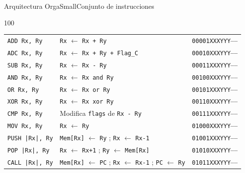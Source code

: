 \documentclass[aspectratio=169]{beamer}
\begin{document}
\begin{frame}[fragile,t]{Arquitectura OrgaSmall}{Conjunto de instrucciones}
\begin{textblock}{100}
\begin{tabular}{l|l|l}
    \texttt{ADD  Rx, Ry}   & \texttt{Rx} $\leftarrow$ \texttt{Rx + Ry}                          & \texttt{\textcolor{r}{00001}\textcolor{v}{XXX}\textcolor{verde}{YYY}\textcolor{gray}{-----}} \\  %
    \texttt{ADC  Rx, Ry}   & \texttt{Rx} $\leftarrow$ \texttt{Rx + Ry + Flag\_C}                & \texttt{\textcolor{r}{00010}\textcolor{v}{XXX}\textcolor{verde}{YYY}\textcolor{gray}{-----}} \\  %
    \texttt{SUB  Rx, Ry}   & \texttt{Rx} $\leftarrow$ \texttt{Rx - Ry}                          & \texttt{\textcolor{r}{00011}\textcolor{v}{XXX}\textcolor{verde}{YYY}\textcolor{gray}{-----}} \\  %
    \texttt{AND  Rx, Ry}   & \texttt{Rx} $\leftarrow$ \texttt{Rx and Ry}                        & \texttt{\textcolor{r}{00100}\textcolor{v}{XXX}\textcolor{verde}{YYY}\textcolor{gray}{-----}} \\  %
    \texttt{OR   Rx, Ry}   & \texttt{Rx} $\leftarrow$ \texttt{Rx or Ry}                         & \texttt{\textcolor{r}{00101}\textcolor{v}{XXX}\textcolor{verde}{YYY}\textcolor{gray}{-----}} \\  %
    \texttt{XOR  Rx, Ry}   & \texttt{Rx} $\leftarrow$ \texttt{Rx xor Ry}                        & \texttt{\textcolor{r}{00110}\textcolor{v}{XXX}\textcolor{verde}{YYY}\textcolor{gray}{-----}} \\  %
    \texttt{CMP  Rx, Ry}   & Modifica \texttt{flags} de \texttt{Rx - Ry}                        & \texttt{\textcolor{r}{00111}\textcolor{v}{XXX}\textcolor{verde}{YYY}\textcolor{gray}{-----}} \\  %
    \texttt{MOV  Rx, Ry}   & \texttt{Rx} $\leftarrow$ \texttt{Ry}                               & \texttt{\textcolor{r}{01000}\textcolor{v}{XXX}\textcolor{verde}{YYY}\textcolor{gray}{-----}} \\  %
    \hline
    \texttt{PUSH |Rx|, Ry} & \texttt{Mem[Rx]} $\leftarrow$ \texttt{Ry} ; \texttt{Rx} $\leftarrow$ \texttt{Rx-1}  & \texttt{\textcolor{r}{01001}\textcolor{v}{XXX}\textcolor{verde}{YYY}\textcolor{gray}{-----}} \\  %
    \texttt{POP  |Rx|, Ry} & \texttt{Rx} $\leftarrow$ \texttt{Rx+1} ; \texttt{Ry} $\leftarrow$ \texttt{Mem[Rx]}  & \texttt{\textcolor{r}{01010}\textcolor{v}{XXX}\textcolor{verde}{YYY}\textcolor{gray}{-----}} \\  %
    \texttt{CALL |Rx|, Ry} & \texttt{Mem[Rx]} $\leftarrow$ \texttt{PC} ; \texttt{Rx} $\leftarrow$ \texttt{Rx-1} ; \texttt{PC} $\leftarrow$ \texttt{Ry}  & \texttt{\textcolor{r}{01011}\textcolor{v}{XXX}\textcolor{verde}{YYY}\textcolor{gray}{-----}} \\  %

\end{tabular}
\end{textblock}
\end{frame}
\end{document}
